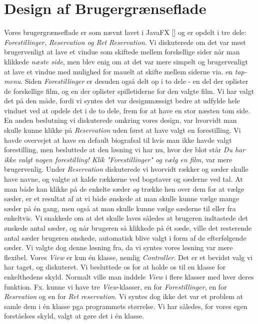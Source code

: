 \documentclass[final]{report}
\begin{document}
\section{Design af Brugergrænseflade}
Vores brugergrænseflade er som nævnt lavet i JavaFX [\cite{javaFX}] og er opdelt i tre dele: \emph{Forestillinger, Reservation og Ret Reservation}. Vi diskuterede om det var mest brugervenligt at lave et vindue som skiftede mellem forskellige sider når man klikkede \emph{næste side}, men blev enig om at det var mere simpelt og brugervenligt at lave et vindue med mulighed for mauelt at skifte mellem siderne via. en \emph{tap-menu}. Siden \emph{Forestillinger} er desuden også delt op i to dele - en del der oplister de forskellige film, og en der oplister spilletiderne for den valgte film. Vi har valgt det på den måde, fordi vi syntes det var designmæssigt bedre at udfylde hele vinduet ved at opdele det i de to dele, frem for at have en stor næsten tom side. 
En anden beslutning vi diskuterede omkring vores design, var hvorvidt man skulle kunne klikke på \emph{Reservation} uden først at have valgt en forestilling. Vi havde overvejet at have en default biografsal til hvis man ikke havde valgt forestilling, men besluttede at den løsning vi har nu, hvor der blot står \emph{Du har ikke valgt nogen forestilling! Klik "Forestillinger" og vælg en film}, var mere brugervenlig. 
Under \emph{Reservation} diskuterede vi hvorvidt rækker og sæder skulle have navne, og valgte at kalde rækkerne ved bogstaver og sæderne ved tal. At man både kan klikke på de enkelte sæder \emph{og} trække hen over dem for at vælge sæder, er et resultat af at vi både ønskede at man skulle kunne vælge mange sæder på én gang, men også at man skulle kunne vælge sæderne til eller fra enkeltvis. Vi snakkede om at det skulle laves således at brugeren indtastede det ønskede antal sæder, og når brugeren så klikkede på ét sæde, ville det resterende antal sæder brugeren ønskede, automatisk blive valgt i form af de efterfølgende sæder. Vi valgte dog denne løsning fra, da vi syntes vores løsning var mere flexibel. 
Vores \emph{View} er kun én klasse, nemlig \emph{Controller}. Det er et bevidst valg vi har taget, og diskuteret. Vi besluttede os for at holde os til en klasse for enkelthedens skyld. Normalt ville man inddele \emph{View} i flere klasser med hver deres funktion. Fx. kunne vi have tre \emph{View}-klasser, en for \emph{Forestillinger}, en for \emph{Resrvation} og en for \emph{Ret reservation}. Vi syntes dog ikke det var et problem at samle dem i én klasse pga programmets størrelse. Vi har således, for vores egen forståelses skyld, valgt at gøre det i én klasse.
\end{document}
